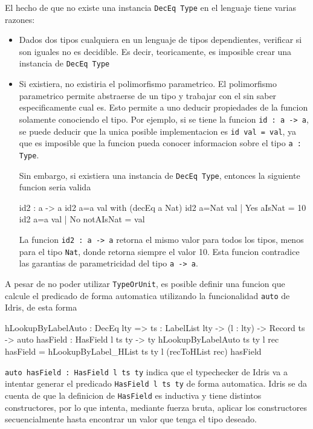 El hecho de que no existe una instancia \texttt{DecEq Type} en el lenguaje tiene varias razones:

\begin{itemize}
\item Dados dos tipos cualquiera en un lenguaje de tipos dependientes, verificar si son iguales no es decidible. Es decir, teoricamente, es imposible crear una instancia de \texttt{DecEq Type}
\item Si existiera, no existiria el polimorfismo parametrico. El polimorfismo parametrico permite abstraerse de un tipo y trabajar con el sin saber especificamente cual es. Esto permite a uno deducir propiedades de la funcion solamente conociendo el tipo. Por ejemplo, si se tiene la funcion \texttt{id : a -> a}, se puede deducir que la unica posible implementacion es \texttt{id val = val}, ya que es imposible que la funcion pueda conocer informacion sobre el tipo \texttt{a : Type}.

Sin embargo, si existiera una instancia de \texttt{DecEq Type}, entonces la siguiente funcion seria valida

\begin{code}
id2 : a -> a
id2 {a=a} val with (decEq a Nat)
  id2 {a=Nat} val | Yes aIsNat = 10
  id2 {a=a} val | No notAIsNat = val
\end{code}

La funcion \texttt{id2 : a -> a} retorna el mismo valor para todos los tipos, menos para el tipo \texttt{Nat}, donde retorna siempre el valor 10. Esta funcion contradice las garantias de parametricidad del tipo \texttt{a -> a}.

\end{itemize}

A pesar de no poder utilizar \texttt{TypeOrUnit}, es posible definir una funcion que calcule el predicado de forma automatica utilizando la funcionalidad \texttt{auto} de Idris, de esta forma

\begin{code}
hLookupByLabelAuto : DecEq lty => {ts : LabelList lty} -> 
  (l : lty) -> Record ts -> 
  {auto hasField : HasField l ts ty} -> ty
hLookupByLabelAuto {ts} {ty} l rec {hasField} = 
  hLookupByLabel_HList {ts} {ty} l (recToHList rec) hasField
\end{code}

\texttt{auto hasField : HasField l ts ty} indica que el typechecker de Idris va a intentar generar el predicado \texttt{HasField l ts ty} de forma automatica. Idris se da cuenta de que la definicion de \texttt{HasField} es inductiva y tiene distintos constructores, por lo que intenta, mediante fuerza bruta, aplicar los constructores secuencialmente hasta encontrar un valor que tenga el tipo deseado.

